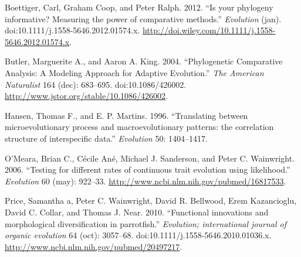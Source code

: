 \documentclass[author-year, review, 12pt]{elsarticle} %
\begin{document}
Boettiger, Carl, Graham Coop, and Peter Ralph. 2012. ``Is your phylogeny
informative? Measuring the power of comparative methods.''
\emph{Evolution} (jan). doi:10.1111/j.1558-5646.2012.01574.x.
\href{http://doi.wiley.com/10.1111/j.1558-5646.2012.01574.x}{http://doi.wiley.com/10.1111/j.1558-5646.2012.01574.x}.

Butler, Marguerite A., and Aaron A. King. 2004. ``Phylogenetic
Comparative Analysis: A Modeling Approach for Adaptive Evolution.''
\emph{The American Naturalist} 164 (dec): 683--695. doi:10.1086/426002.
\href{http://www.jstor.org/stable/10.1086/426002}{http://www.jstor.org/stable/10.1086/426002}.

Hansen, Thomas F., and E. P. Martins. 1996. ``Translating between
microevolutionary process and macroevolutionary patterns: the
correlation structure of interspecific data.'' \emph{Evolution} 50:
1404--1417.

O'Meara, Brian C., Cécile Ané, Michael J. Sanderson, and Peter C.
Wainwright. 2006. ``Testing for different rates of continuous trait
evolution using likelihood.'' \emph{Evolution} 60 (may): 922--33.
\href{http://www.ncbi.nlm.nih.gov/pubmed/16817533}{http://www.ncbi.nlm.nih.gov/pubmed/16817533}.

Price, Samantha a, Peter C. Wainwright, David R. Bellwood, Erem
Kazancioglu, David C. Collar, and Thomas J. Near. 2010. ``Functional
innovations and morphological diversification in parrotfish.''
\emph{Evolution; international journal of organic evolution} 64 (oct):
3057--68. doi:10.1111/j.1558-5646.2010.01036.x.
\href{http://www.ncbi.nlm.nih.gov/pubmed/20497217}{http://www.ncbi.nlm.nih.gov/pubmed/20497217}.



\end{document}
